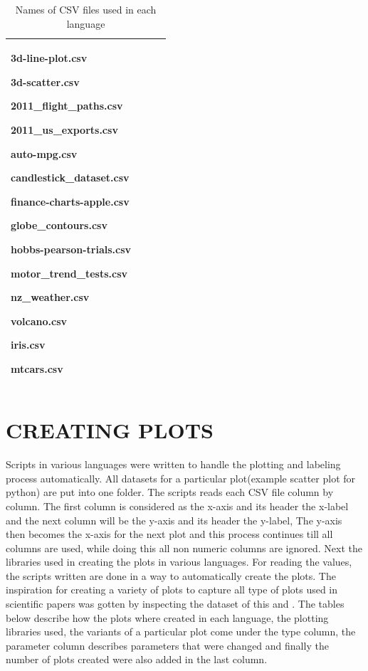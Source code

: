 \documentclass[12pt, a4paper,oneside]{report}
\begin{document}
\begin{table}[h]
\begin{tabular}{|p{5cm}|p{3cm}|p{3cm}|p{4cm}|}
		3d-line-plot.csv \par 3d-scatter.csv \par 2011\_flight\_paths.csv \par 2011\_us\_exports.csv \par auto-mpg.csv \par candlestick\_dataset.csv \par finance-charts-apple.csv \par 
		globe\_contours.csv\par hobbs-pearson-trials.csv \par motor\_trend\_tests.csv \par 
		nz\_weather.csv \par volcano.csv \par iris.csv \par mtcars.csv	\\ \hline
		

	\end{tabular}
	
	\caption {Names of CSV files used in each language}	\label{Table:1}
\end{table}


\chapter{CREATING PLOTS}
Scripts in various languages were written to handle the plotting and labeling process automatically. All datasets for a particular plot(example scatter plot for python) are put into one folder. The scripts reads each CSV file column by column. The first column is considered as the x-axis and its header the x-label and the next column will be the y-axis and its header the y-label, The y-axis then becomes the x-axis for the next plot and this process continues till all columns are used, while doing this all non numeric columns are ignored. 
Next the libraries used in creating the plots in various languages. For reading the values, the scripts written are done in a way to automatically create the plots. The inspiration for creating a variety of plots to capture all type of plots used in scientific papers was gotten by inspecting the dataset of this \cite{junior2017architecture} and \cite{lee2018viziometrics}. The tables below describe how the plots where created in each language, the plotting libraries used, the variants of a particular plot come under the type column, the parameter column describes parameters that were changed and finally the number of plots created were also added in the last column.
\end{document}
